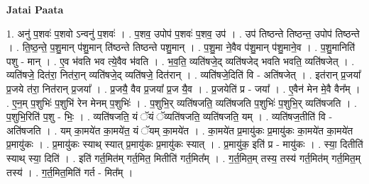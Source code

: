 \documentclass[17pt]{extarticle}
\begin{document}
\textbf{Jatai Paata} \newline

1. अनु॑ प॒शवः॑ प॒शवो ऽन्वनु॑ प॒शवः॑ । . प॒शव॒ उपोप॑ प॒शवः॑ प॒शव॒ उप॑ । . उप॑ तिष्ठन्ते तिष्ठन्त॒ उपोप॑ तिष्ठन्ते । . ति॒ष्ठ॒न्ते॒ प॒शु॒मान् प॑शु॒मान् ति॑ष्ठन्ते तिष्ठन्ते पशु॒मान् । . प॒शु॒मा ने॒वैव प॑शु॒मान् प॑शु॒माने॒व । . प॒शु॒मानिति॑ पशु - मान् । . ए॒व भ॑वति भव त्ये॒वैव भ॑वति । . भ॒व॒ति॒ व्यति॑षजे॒द् व्यति॑षजेद् भवति भवति॒ व्यति॑षजेत् । . व्यति॑षजे॒ दित॑रा॒ नित॑रा॒न् व्यति॑षजे॒द् व्यति॑षजे॒ दित॑रान् । . व्यति॑षजे॒दिति॑ वि - अति॑षजेत् । . इत॑रान् प्र॒जया᳚ प्र॒जये त॑रा॒ नित॑रान् प्र॒जया᳚ । . प्र॒जयै॒ वैव प्र॒जया᳚ प्र॒ज यै॒व । . प्र॒जयेति॑ प्र - जया᳚ । . ए॒वैन॑ मेन मे॒वै वैन᳚म् । . ए॒न॒म् प॒शुभिः॑ प॒शुभि॑ रेन मेनम् प॒शुभिः॑ । . प॒शुभि॒र् व्यति॑षजति॒ व्यति॑षजति प॒शुभिः॑ प॒शुभि॒र् व्यति॑षजति । . प॒शुभि॒रिति॑ प॒शु - भिः॒ । . व्यति॑षजति॒ यं ॅयं ॅव्यति॑षजति॒ व्यति॑षजति॒ यम् । . व्यति॑षज॒तीति॑ वि - अति॑षजति । . यम् का॒मये॑त का॒मये॑त॒ यं ॅयम् का॒मये॑त । . का॒मये॑त प्र॒मायु॑कः प्र॒मायु॑कः का॒मये॑त का॒मये॑त प्र॒मायु॑कः । . प्र॒मायु॑कः स्याथ् स्यात् प्र॒मायु॑कः प्र॒मायु॑कः स्यात् । . प्र॒मायु॑क॒ इति॑ प्र - मायु॑कः । . स्या॒ दितीति॑ स्याथ् स्या॒ दिति॑ । . इति॑ गर्त॒मित॑म् गर्त॒मित॒ मितीति॑ गर्त॒मित᳚म् । . ग॒र्त॒मित॒म् तस्य॒ तस्य॑ गर्त॒मित॑म् गर्त॒मित॒म् तस्य॑ । . ग॒र्त॒मित॒मिति॑ गर्त - मित᳚म् । \newline
\end{document}
